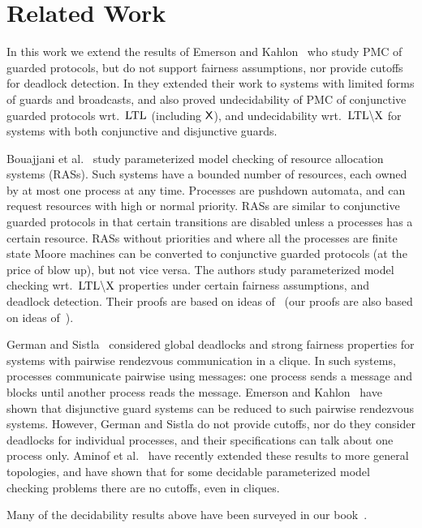 \section{Related Work} \label{gua:sec:related}

In this work we extend the results of Emerson and Kahlon~\cite{Emerson00} who study PMC of guarded protocols, but do not support fairness assumptions, nor provide cutoffs for 
deadlock detection.
In \cite{EmersonK03} they extended their work to systems with limited forms of guards and broadcasts, and also proved undecidability 
of PMC of conjunctive guarded protocols wrt.\ $\text{LTL}$ (including $\operatorname{\mathsf{X}}$), 
and undecidability wrt.\ $\text{LTL}\backslash\text{X}$ for systems with both 
conjunctive and disjunctive guards.

Bouajjani et al.~\cite{Bouajjani08} study parameterized model checking of
resource allocation systems (RASs). Such systems have a bounded number of resources, 
each owned by at most one process at any time. Processes are pushdown automata, 
and can request resources with high or normal priority.
RASs are similar to conjunctive guarded protocols in that certain
transitions are disabled unless a processes has a certain resource. 
RASs without priorities and where all the processes are finite state Moore machines can 
be converted to conjunctive guarded protocols (at the price of blow up), 
but not vice versa.
The authors study parameterized model checking wrt.\ $\text{LTL}\backslash\text{X}$ properties under certain fairness assumptions,
and deadlock detection.
Their proofs are based on ideas of~\cite{Emerson00} (our proofs are also based on ideas of~\cite{Emerson00}).
 
German and Sistla~\cite{German92} considered global deadlocks and strong fairness properties for systems with pairwise rendezvous communication in a clique.
In such systems, processes communicate pairwise using messages:
one process sends a message and blocks until another process reads the message.
Emerson and Kahlon~\protect\cite{EmersonK03} have shown that disjunctive guard systems can be reduced to such pairwise rendezvous systems.
However, German and Sistla \cite{German92} do not provide cutoffs, 
nor do they consider deadlocks for individual processes,
and their specifications can talk about one process only.
%
Aminof et al.~\cite{AminofKRSV14} have 
recently extended these results to more general topologies, and have 
shown that for some decidable parameterized model checking problems there are no cutoffs,
even in cliques.

Many of the decidability results above have been surveyed in our book~\cite{BloemETAL15}.
